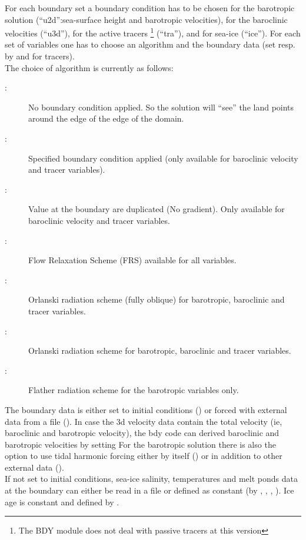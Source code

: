 \documentclass[../main/NEMO_manual]{subfiles}
\begin{document}
For each boundary set a boundary condition has to be chosen for the barotropic solution
(``u2d'':sea-surface height and barotropic velocities), for the baroclinic velocities (``u3d''),
for the active tracers \footnote{The BDY module does not deal with passive tracers at this version} (``tra''), and for sea-ice (``ice'').
For each set of variables one has to choose an algorithm and the boundary data (set resp. by  and  for tracers).\\

The choice of algorithm is currently as follows:

\begin{description}
\item [:] No boundary condition applied.
  So the solution will ``see'' the land points around the edge of the edge of the domain.
\item [:] Specified boundary condition applied (only available for baroclinic velocity and tracer variables).
\item [:] Value at the boundary are duplicated (No gradient). Only available for baroclinic velocity and tracer variables.
\item [:] Flow Relaxation Scheme (FRS) available for all variables.
\item [:] Orlanski radiation scheme (fully oblique) for barotropic, baroclinic and tracer variables.
\item [:] Orlanski radiation scheme for barotropic, baroclinic and tracer variables.
\item [:] Flather radiation scheme for the barotropic variables only.
\end{description}

The boundary data is either set to initial conditions
() or forced with external data from a file ().
In case the 3d velocity data contain the total velocity (ie, baroclinic and barotropic velocity),
the bdy code can derived baroclinic and barotropic velocities by setting 
For the barotropic solution there is also the option to use tidal harmonic forcing either by
itself () or in addition to other external data ().\\
If not set to initial conditions, sea-ice salinity, temperatures and melt ponds data at the boundary can either be read in a file or defined as constant (by , , , ). Ice age is constant and defined by .
\end{document}
